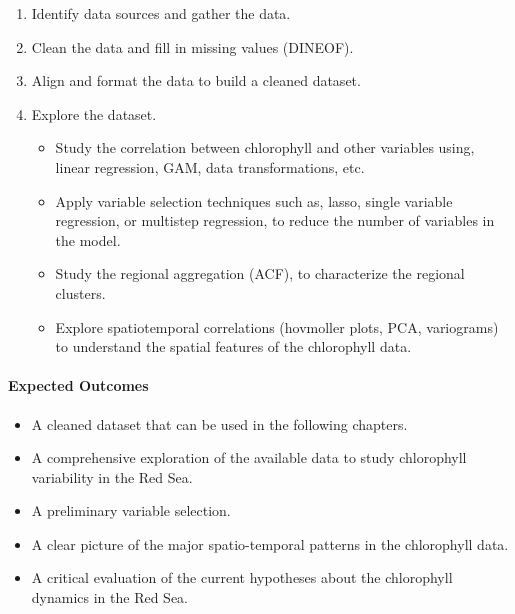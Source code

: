 \begin{enumerate} 

\item Identify data sources and gather the data.

\item Clean the data and fill in missing values (DINEOF).

\item Align and format the data to build a cleaned dataset.

\item Explore the dataset.

\begin{itemize} 

\item Study the correlation between chlorophyll and other variables using,
linear regression, GAM, data transformations, etc.

\item Apply variable selection techniques such as, lasso, single variable
regression, or multistep regression, to reduce the number of variables in the
model.

\item Study the regional aggregation (ACF), to characterize the regional
clusters.

\item Explore spatiotemporal correlations (hovmoller plots, PCA, variograms) to
understand the spatial features of the chlorophyll data.

\end{itemize}

\end{enumerate}

\paragraph{Expected Outcomes}

\begin{itemize} 

\item A cleaned dataset that can be used in the following chapters.

\item A comprehensive exploration of the available data to study chlorophyll
variability in the Red Sea.

\item A preliminary variable selection.

\item A clear picture of the major spatio-temporal patterns in the
chlorophyll data.

\item A critical evaluation of the current hypotheses about the chlorophyll
dynamics in the Red Sea.

\end{itemize}

